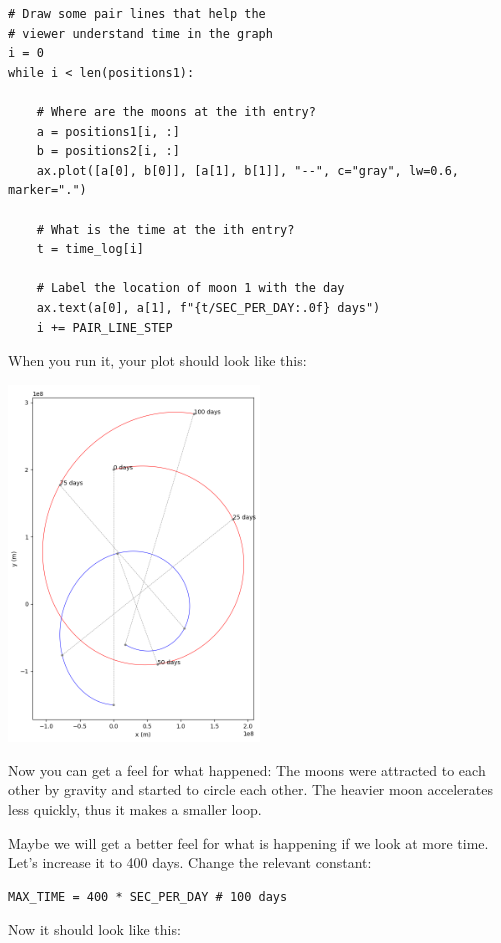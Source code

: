 \begin{verbatim}
# Draw some pair lines that help the
# viewer understand time in the graph
i = 0
while i < len(positions1):

    # Where are the moons at the ith entry?
    a = positions1[i, :]
    b = positions2[i, :]
    ax.plot([a[0], b[0]], [a[1], b[1]], "--", c="gray", lw=0.6, marker=".")

    # What is the time at the ith entry?
    t = time_log[i]

    # Label the location of moon 1 with the day
    ax.text(a[0], a[1], f"{t/SEC_PER_DAY:.0f} days")
    i += PAIR_LINE_STEP
\end{verbatim}

When you run it,  your plot should look like this:

\includegraphics[width=0.5\textwidth]{plotmoons_02.png}

Now you can get a feel for what happened:  The moons were attracted to each other by gravity and started to circle each other. The heavier moon accelerates less quickly,  thus it makes a smaller loop.

Maybe we will get a better feel for what is happening if we look at more time.   Let's increase it to 400 days.  Change the relevant constant:

\begin{verbatim}
MAX_TIME = 400 * SEC_PER_DAY # 100 days
\end{verbatim}

Now it should look like this:

